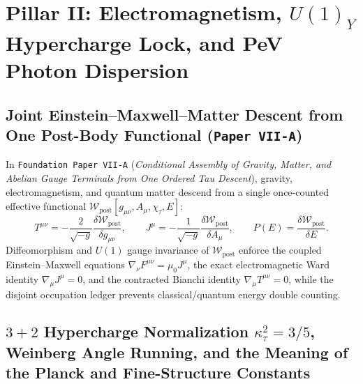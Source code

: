 \documentclass[11pt,a4paper]{article}
\begin{document}
\section{Pillar II: Electromagnetism, $U(1)_Y$ Hypercharge Lock, and PeV Photon Dispersion}

\subsection{Joint Einstein--Maxwell--Matter Descent from One Post-Body Functional (\texttt{Paper VII-A})}

In \texttt{Foundation Paper VII-A} (\emph{Conditional Assembly of Gravity, Matter, and Abelian Gauge Terminals from One Ordered Tau Descent}), gravity, electromagnetism, and quantum matter descend from a single once-counted effective functional $\mathcal{W}_{\mathrm{post}}[g_{\mu\nu},A_\mu,\chi_\tau,E]$:
\begin{equation}
T^{\mu\nu} = -\frac{2}{\sqrt{-g}}\frac{\delta\mathcal{W}_{\mathrm{post}}}{\delta g_{\mu\nu}},\qquad
J^\mu = -\frac{1}{\sqrt{-g}}\frac{\delta\mathcal{W}_{\mathrm{post}}}{\delta A_\mu},\qquad
P(E) = \frac{\delta\mathcal{W}_{\mathrm{post}}}{\delta E}.
\label{eq:joint-descent}
\end{equation}
Diffeomorphism and $U(1)$ gauge invariance of $\mathcal{W}_{\mathrm{post}}$ enforce the coupled Einstein--Maxwell equations $\nabla_\nu F^{\mu\nu} = \mu_0 J^\mu$, the exact electromagnetic Ward identity $\nabla_\mu J^\mu = 0$, and the contracted Bianchi identity $\nabla_\mu T^{\mu\nu} = 0$, while the disjoint occupation ledger prevents classical/quantum energy double counting.

\subsection{$3+2$ Hypercharge Normalization $\kappa_\tau^2 = 3/5$, Weinberg Angle Running, and the Meaning of the Planck and Fine-Structure Constants}
\end{document}
